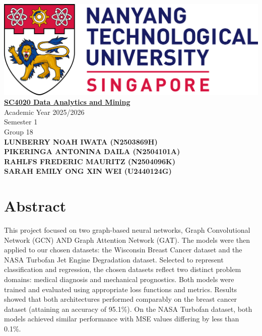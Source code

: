\documentclass[12pt]{article}
\begin{document}
\begin{center}
    \includegraphics[width=\linewidth]{NTU_Logo.png}
    \\[1cm]
    \underline{\textbf{SC4020 Data Analytics and Mining}}
    \\[1.5em]
    Academic Year 2025/2026
    \\[1em]
    Semester 1
    \\[2em]
    Group 18
    \\[5em]
    \textbf{
        LUNBERRY NOAH IWATA (N2503869H) \\[1em]
        PIKERINGA ANTONINA DAILA (N2504101A) \\[1em]
        RAHLFS FREDERIC MAURITZ (N2504096K) \\[1em]
        SARAH EMILY ONG XIN WEI (U2440124G) \\[1em]
        }
\end{center}
\pagebreak

\justifying

\pagestyle{fancy}
\fancyhf{}  %
\fancyhead[R]{\textcolor{gray}{\nouppercase{\leftmark}}}   %
\fancyfoot[C]{\thepage}  %


\section*{Abstract}

This project focused on two graph-based neural networks, Graph Convolutional Network (GCN) AND Graph Attention Network (GAT). 
The models were then applied to our chosen datasets: the Wisconsin Breast Cancer dataset and the NASA Turbofan Jet Engine Degradation dataset. 
Selected to represent classification and regression, the chosen datasets reflect two distinct problem domains: medical diagnosis and mechanical prognostics. 
Both models were trained and evaluated using appropriate loss functions and metrics. 
Results showed that both architectures performed comparably on the breast cancer dataset (attaining an accuracy of 95.1\%). 
On the NASA Turbofan dataset, both models achieved similar performance with MSE values differing by less than 0.1\%.
\end{document}
